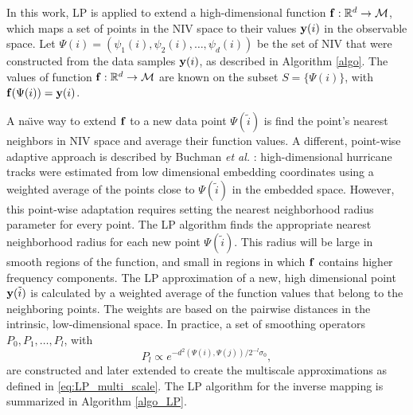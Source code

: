 In this work, LP is applied to extend a high-dimensional function $\mathbf{f}:\mathbb{R}^d \rightarrow \mathcal{M}$,
which maps a set of points in the NIV space to their values $\mathbf{y}(i)$ in the observable space.
%
Let $\Psi(i) = \left(\psi_1(i),\psi_2(i),\ldots,\psi_d(i)\right)$ be the set of NIV that were constructed from the data samples $\mathbf{y}(i)$, as described in Algorithm \ref{algo}.
%
The values of function $\mathbf{f}:\mathbb{R}^d \rightarrow \mathcal{M}$ are known on the subset $S = \{\Psi(i)\}$, with $\mathbf{f}(\Psi(i)) = \mathbf{y}(i)$.

A na\"{\i}ve way to extend $\mathbf{f}$ to a new data point $\Psi(\tilde{i})$ is find the point's nearest neighbors in NIV space and average their function values.
%
A different, point-wise adaptive approach is described by Buchman {\em et al.} \cite{buchman2011high}:
high-dimensional hurricane tracks were estimated from low dimensional embedding coordinates using a weighted average of the points close to $\Psi(\tilde{i})$ in the embedded space.
%
However, this point-wise adaptation requires setting the nearest neighborhood radius parameter for every point.
%
The LP algorithm finds the appropriate nearest neighborhood radius for each new point $\Psi(\tilde{i})$.
%
This radius will be large in smooth regions of the function, and small in regions in which $\mathbf{f}$ contains higher frequency components.
%
The LP approximation of a new, high dimensional point $\mathbf{y}(\tilde{i})$ is calculated by a weighted average of the function values that belong to the neighboring points.
%
The weights are based on the pairwise distances in the intrinsic, low-dimensional space.
%
In practice, a set of smoothing operators $P_0, P_1, \ldots, P_l$, with
\begin{equation} \label{eq:LP_multi_scale_app}
P_l \propto e^{-d^2(\Psi(i),\Psi(j)) / 2^{-l} \sigma_0},
\end{equation}
are constructed and later extended to create the multiscale approximations as defined in \eqref{eq:LP_multi_scale}.
%
The LP algorithm for the inverse mapping is summarized in Algorithm \ref{algo_LP}.

